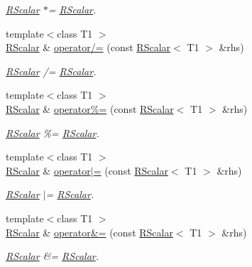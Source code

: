 \begin{DoxyCompactItemize}
\begin{DoxyCompactList}\small\item\em \mbox{\hyperlink{classENSEM_1_1RScalar}{R\+Scalar}} $\ast$= \mbox{\hyperlink{classENSEM_1_1RScalar}{R\+Scalar}}. \end{DoxyCompactList}\item 
{\footnotesize template$<$class T1 $>$ }\\\mbox{\hyperlink{classENSEM_1_1RScalar}{R\+Scalar}} \& \mbox{\hyperlink{classENSEM_1_1RScalar_a8d8cc49d7fed142b93c987c653465000}{operator/=}} (const \mbox{\hyperlink{classENSEM_1_1RScalar}{R\+Scalar}}$<$ T1 $>$ \&rhs)
\begin{DoxyCompactList}\small\item\em \mbox{\hyperlink{classENSEM_1_1RScalar}{R\+Scalar}} /= \mbox{\hyperlink{classENSEM_1_1RScalar}{R\+Scalar}}. \end{DoxyCompactList}\item 
{\footnotesize template$<$class T1 $>$ }\\\mbox{\hyperlink{classENSEM_1_1RScalar}{R\+Scalar}} \& \mbox{\hyperlink{classENSEM_1_1RScalar_ac5ab25042d679a621ccb42d13fb3b441}{operator\%=}} (const \mbox{\hyperlink{classENSEM_1_1RScalar}{R\+Scalar}}$<$ T1 $>$ \&rhs)
\begin{DoxyCompactList}\small\item\em \mbox{\hyperlink{classENSEM_1_1RScalar}{R\+Scalar}} \%= \mbox{\hyperlink{classENSEM_1_1RScalar}{R\+Scalar}}. \end{DoxyCompactList}\item 
{\footnotesize template$<$class T1 $>$ }\\\mbox{\hyperlink{classENSEM_1_1RScalar}{R\+Scalar}} \& \mbox{\hyperlink{classENSEM_1_1RScalar_ad5838d1c3d7169f6cc7f9b78fe42ac59}{operator$\vert$=}} (const \mbox{\hyperlink{classENSEM_1_1RScalar}{R\+Scalar}}$<$ T1 $>$ \&rhs)
\begin{DoxyCompactList}\small\item\em \mbox{\hyperlink{classENSEM_1_1RScalar}{R\+Scalar}} $\vert$= \mbox{\hyperlink{classENSEM_1_1RScalar}{R\+Scalar}}. \end{DoxyCompactList}\item 
{\footnotesize template$<$class T1 $>$ }\\\mbox{\hyperlink{classENSEM_1_1RScalar}{R\+Scalar}} \& \mbox{\hyperlink{classENSEM_1_1RScalar_aa091ededdea0fc13deb359321f213780}{operator\&=}} (const \mbox{\hyperlink{classENSEM_1_1RScalar}{R\+Scalar}}$<$ T1 $>$ \&rhs)
\begin{DoxyCompactList}\small\item\em \mbox{\hyperlink{classENSEM_1_1RScalar}{R\+Scalar}} \&= \mbox{\hyperlink{classENSEM_1_1RScalar}{R\+Scalar}}. \end{DoxyCompactList}\item 

\end{DoxyCompactItemize}
